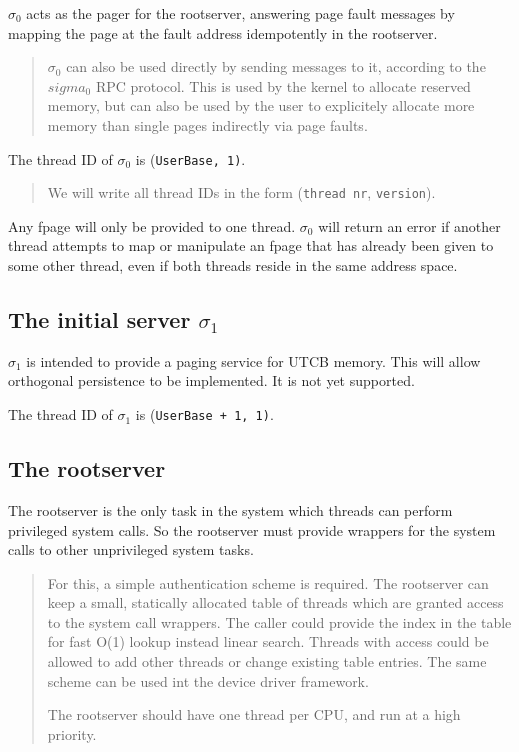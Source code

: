 \documentclass[9pt,a4paper]{extarticle}
\newenvironment{comment}{\footnotesize \begin{quote}}{\end{quote}}
\begin{document}
$\sigma_0$ acts as the pager for the rootserver, answering page fault
messages by mapping the page at the fault address idempotently in the
rootserver.

\begin{comment}
  $\sigma_0$ can also be used directly by sending messages to it,
  according to the $sigma_0$ RPC protocol.  This is used by the kernel
  to allocate reserved memory, but can also be used by the user to
  explicitely allocate more memory than single pages indirectly via
  page faults.
\end{comment}

The thread ID of $\sigma_0$ is (\verb/UserBase, 1)/.

\begin{comment}
  We will write all thread IDs in the form (\verb/thread nr/,
  \verb/version/).
\end{comment}

Any fpage will only be provided to one thread.  $\sigma_0$ will return
an error if another thread attempts to map or manipulate an fpage that
has already been given to some other thread, even if both threads
reside in the same address space.


\subsection{The initial server $\sigma_1$}

$\sigma_1$ is intended to provide a paging service for UTCB memory.
This will allow orthogonal persistence to be implemented.  It is not
yet supported.

The thread ID of $\sigma_1$ is (\verb/UserBase + 1, 1)/.


\subsection{The rootserver}

The rootserver is the only task in the system which threads can
perform privileged system calls.  So the rootserver must provide
wrappers for the system calls to other unprivileged system tasks.

\begin{comment}
  For this, a simple authentication scheme is required.  The
  rootserver can keep a small, statically allocated table of threads
  which are granted access to the system call wrappers.  The caller
  could provide the index in the table for fast O(1) lookup instead
  linear search.  Threads with access could be allowed to add other
  threads or change existing table entries.  The same scheme can be
  used int the device driver framework.
  
  The rootserver should have one thread per CPU, and run at a high
  priority.
\end{comment}
\end{document}

